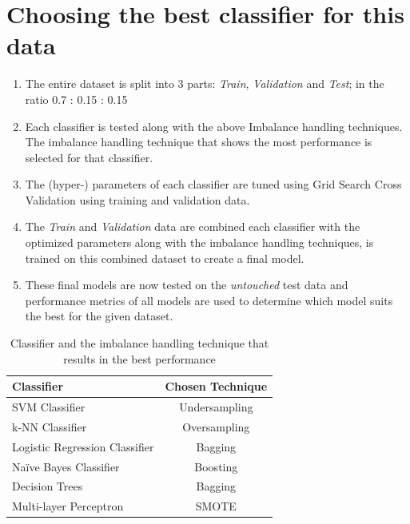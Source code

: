 \documentclass[letterpaper, 11 pt, conference]{ieeeconf}  %
\begin{document}
\section{Choosing the best classifier for this data}
\begin{enumerate}
	\item The entire dataset is split into 3 parts: \textit{Train}, \textit{Validation} and \textit{Test}; in the ratio 0.7 : 0.15 : 0.15
	
	\item Each classifier is tested along with the above Imbalance handling techniques. The imbalance handling technique that shows the most performance is selected for that classifier.
	
	\item The (hyper-) parameters of each classifier are tuned using Grid Search Cross Validation using training and validation data.
	
	\item The \textit{Train} and \textit{Validation} data are combined each classifier with the optimized parameters along with the imbalance handling techniques, is trained on this combined dataset to create a final model.
	
	\item These final models are now tested on the \textit{untouched} test data and performance metrics of all models are used to determine which model suits the best for the given dataset.
\end{enumerate}

\begin{table}[h]
	\centering
	\begin{tabular}{|l|c|}
		\hline
		\textbf{Classifier} & \textbf{Chosen Technique}\\\hline
		SVM Classifier & Undersampling\\
		k-NN Classifier & Oversampling\\
		Logistic Regression Classifier & Bagging\\
		Na\"ive Bayes Classifier & Boosting\\
		Decision Trees & Bagging\\
		Multi-layer Perceptron & SMOTE	\\\hline
	\end{tabular}
	\caption{Classifier and the imbalance handling technique that results in the best performance}
\end{table}
\vspace{5cm}
\end{document}
